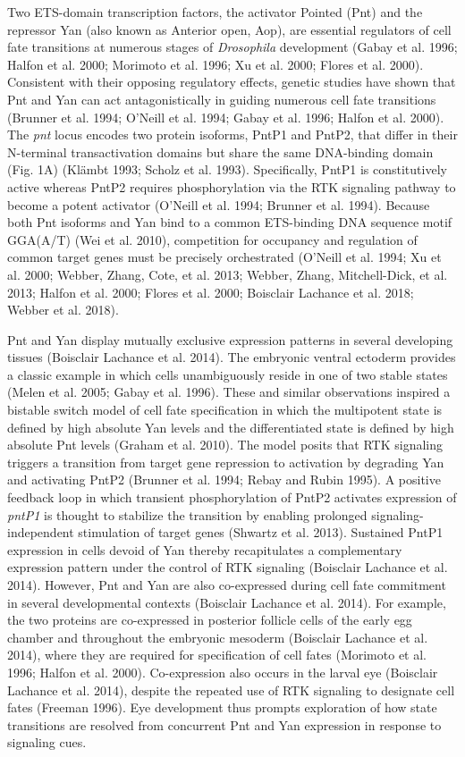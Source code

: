 Two ETS-domain transcription factors, the activator Pointed (Pnt) and the repressor Yan (also known as Anterior open, Aop), are essential regulators of cell fate transitions at numerous stages of \emph{Drosophila} development (Gabay et al. 1996; Halfon et al. 2000; Morimoto et al. 1996; Xu et al. 2000; Flores et al. 2000). Consistent with their opposing regulatory effects, genetic studies have shown that Pnt and Yan can act antagonistically in guiding numerous cell fate transitions (Brunner et al. 1994; O'Neill et al. 1994; Gabay et al. 1996; Halfon et al. 2000). The \emph{pnt} locus encodes two protein isoforms, PntP1 and PntP2, that differ in their N-terminal transactivation domains but share the same DNA-binding domain (Fig. 1A) (Klämbt 1993; Scholz et al. 1993). Specifically, PntP1 is constitutively active whereas PntP2 requires phosphorylation via the RTK signaling pathway to become a potent activator (O'Neill et al. 1994; Brunner et al. 1994). Because both Pnt isoforms and Yan bind to a common ETS-binding DNA sequence motif GGA(A/T) (Wei et al. 2010), competition for occupancy and regulation of common target genes must be precisely orchestrated (O'Neill et al. 1994; Xu et al. 2000; Webber, Zhang, Cote, et al. 2013; Webber, Zhang, Mitchell-Dick, et al. 2013; Halfon et al. 2000; Flores et al. 2000; Boisclair Lachance et al. 2018; Webber et al. 2018).

Pnt and Yan display mutually exclusive expression patterns in several developing tissues (Boisclair Lachance et al. 2014). The embryonic ventral ectoderm provides a classic example in which cells unambiguously reside in one of two stable states (Melen et al. 2005; Gabay et al. 1996). These and similar observations inspired a bistable switch model of cell fate specification in which the multipotent state is defined by high absolute Yan levels and the differentiated state is defined by high absolute Pnt levels (Graham et al. 2010). The model posits that RTK signaling triggers a transition from target gene repression to activation by degrading Yan and activating PntP2 (Brunner et al. 1994; Rebay and Rubin 1995). A positive feedback loop in which transient phosphorylation of PntP2 activates expression of \emph{pntP1} is thought to stabilize the transition by enabling prolonged signaling-independent stimulation of target genes (Shwartz et al. 2013). Sustained PntP1 expression in cells devoid of Yan thereby recapitulates a complementary expression pattern under the control of RTK signaling (Boisclair Lachance et al. 2014). However, Pnt and Yan are also co-expressed during cell fate commitment in several developmental contexts (Boisclair Lachance et al. 2014). For example, the two proteins are co-expressed in posterior follicle cells of the early egg chamber and throughout the embryonic mesoderm (Boisclair Lachance et al. 2014), where they are required for specification of cell fates (Morimoto et al. 1996; Halfon et al. 2000). Co-expression also occurs in the larval eye (Boisclair Lachance et al. 2014), despite the repeated use of RTK signaling to designate cell fates (Freeman 1996). Eye development thus prompts exploration of how state transitions are resolved from concurrent Pnt and Yan expression in response to signaling cues.

